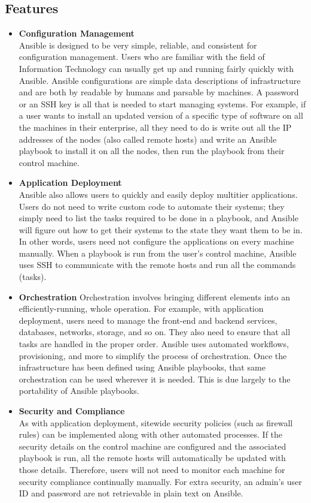 \documentclass[a4paper, 12pt]{article}
\begin{document}
\subsection{Features}
\begin{itemize}
\item
\textbf{Configuration Management}\\
Ansible is designed to be very simple, reliable, and consistent for configuration management. Users who are familiar with the field of Information Technology can usually get up and running fairly quickly with Ansible. Ansible configurations are simple data descriptions of infrastructure and are both by readable by humans and parsable by machines. A password or an SSH key is all that is needed to start managing systems. For example, if a user wants to install an updated version of a specific type of software on all the machines in their enterprise, all they need to do is write out all the IP addresses of the nodes (also called remote hosts) and write an Ansible playbook to install it on all the nodes, then run the playbook from their control machine.
\item
\textbf{Application Deployment}\\
Ansible also allows users to quickly and easily deploy multitier applications. Users do not need to write custom code to automate their systems; they simply need to list the tasks required to be done in a playbook, and Ansible will figure out how to get their systems to the state they want them to be in. In other words, users need not configure the applications on every machine manually. When a playbook is run from the user's control machine, Ansible uses SSH to communicate with the remote hosts and run all the commands (tasks).
\item
\textbf{Orchestration}
Orchestration involves bringing different elements into an efficiently-running, whole operation. For example, with application deployment, users need to manage the front-end and backend services, databases, networks, storage, and so on. They also need to ensure that all tasks are handled in the proper order. Ansible uses automated workflows, provisioning, and more to simplify the process of orchestration. Once the infrastructure has been defined using Ansible playbooks, that same orchestration can be used wherever it is needed. This is due largely to the portability of Ansible playbooks.
\item
\textbf{Security and Compliance}\\
As with application deployment, sitewide security policies (such as firewall rules) can be implemented along with other automated processes. If the security details on the control machine are configured and the associated playbook is run, all the remote hosts will automatically be updated with those details. Therefore, users will not need to monitor each machine for security compliance continually manually. For extra security, an admin's user ID and password are not retrievable in plain text on Ansible.

\end{itemize}
\end{document}
